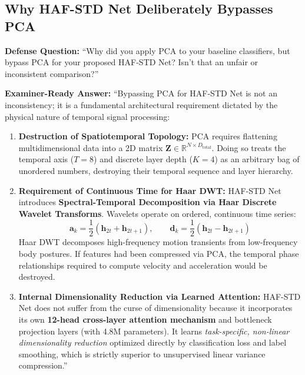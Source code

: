\documentclass[11pt, a4paper]{article}
\begin{document}
\subsection{Why HAF-STD Net Deliberately Bypasses PCA}

\begin{defensebox}
\textbf{Defense Question:} ``Why did you apply PCA to your baseline classifiers, but bypass PCA for your proposed HAF-STD Net? Isn't that an unfair or inconsistent comparison?''

\textbf{Examiner-Ready Answer:}
``Bypassing PCA for HAF-STD Net is not an inconsistency; it is a fundamental architectural requirement dictated by the physical nature of temporal signal processing:
\begin{enumerate}[leftmargin=1.2em]
    \item \textbf{Destruction of Spatiotemporal Topology:} PCA requires flattening multidimensional data into a 2D matrix $\mathbf{Z} \in \mathbb{R}^{N \times D_{\text{total}}}$. Doing so treats the temporal axis ($T=8$) and discrete layer depth ($K=4$) as an arbitrary bag of unordered numbers, destroying their temporal sequence and layer hierarchy.
    \item \textbf{Requirement of Continuous Time for Haar DWT:} HAF-STD Net introduces \textbf{Spectral-Temporal Decomposition via Haar Discrete Wavelet Transforms}. Wavelets operate on ordered, continuous time series:
    $$\mathbf{a}_k = \frac{1}{2}(\mathbf{h}_{2t} + \mathbf{h}_{2t+1}), \qquad \mathbf{d}_k = \frac{1}{2}(\mathbf{h}_{2t} - \mathbf{h}_{2t+1})$$
    Haar DWT decomposes high-frequency motion transients from low-frequency body postures. If features had been compressed via PCA, the temporal phase relationships required to compute velocity and acceleration would be destroyed.
    \item \textbf{Internal Dimensionality Reduction via Learned Attention:} HAF-STD Net does not suffer from the curse of dimensionality because it incorporates its own \textbf{12-head cross-layer attention mechanism} and bottleneck projection layers (with 4.8M parameters). It learns \emph{task-specific, non-linear dimensionality reduction} optimized directly by classification loss and label smoothing, which is strictly superior to unsupervised linear variance compression.''
\end{enumerate}
\end{defensebox}

\clearpage
\end{document}
